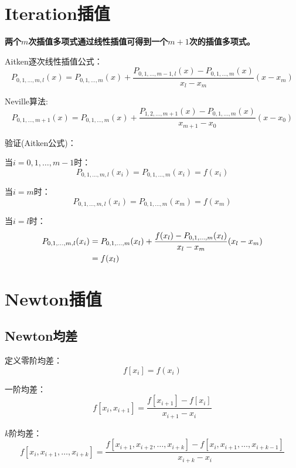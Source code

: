 	
\newpage
\section{Iteration插值}
	\textbf{两个$m$次插值多项式通过线性插值可得到一个$m+1$次的插值多项式。}
	
	Aitken逐次线性插值公式：
	\begin{equation}
	P_{0,1,\dots,m,l}(x) = P_{0,1,\dots,m}(x) + \frac{P_{0,1,\dots,m-1,l}(x) - P_{0,1,\dots,m}(x)}{x_l - x_m}(x-x_m)
	\end{equation}
	
	Neville算法:
	\begin{equation}
	P_{0,1,\dots,m+1}(x) = P_{0,1,\dots,m}(x) + \frac{P_{1,2,\dots,m+1}(x) - P_{0,1,\dots,m}(x)}{x_{m+1} - x_0}(x-x_0)
	\end{equation}

	验证(Aitken公式)：
	
	当$i=0,1,\dots,m-1$时：
	$$
	P_{0,1,\dots,m,l}(x_i) = P_{0,1,\dots,m}(x_i) = f(x_i)
	$$

	当$i=m$时：
	$$
	P_{0,1,\dots,m,l}(x_i) = P_{0,1,\dots,m}(x_m) = f(x_m)
	$$	

	当$i=l$时：
	\begin{align}
	P_{0,1,\dots,m,l}(x_i) &= P_{0,1,\dots,m}(x_l) + \frac{f(x_l)-P_{0,1,\dots,m}(x_l)}{x_l-x_m}(x_l-x_m)\notag \\
	&= f(x_l) \notag
	\end{align}


\newpage
\section{Newton插值}
\subsection{Newton均差}
定义零阶均差：
$$
f[x_i] = f(x_i)
$$

一阶均差：
$$
f[x_i, x_{i+1}] = \frac{f[x_{i+1}]-f[x_i]}{x_{i+1} - x_i}
$$

$k$阶均差：
$$
f[x_i, x_{i+1},\dots, x_{i+k}] = \frac{f[x_{i+1},x_{i+2},\dots,x_{i+k}]-f[x_i,x_{i+1},\dots,x_{i+k-1}]}{x_{i+k} - x_i}
$$


